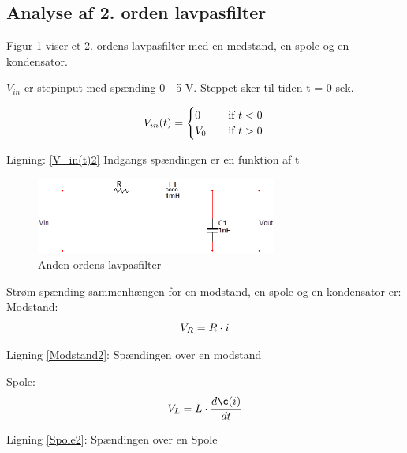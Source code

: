 \newpage

\subsection{Analyse af 2. orden lavpasfilter}

Figur \ref{2orden_ana} viser et 2. ordens lavpasfilter med en medstand, en spole og en kondensator.

$V_{in}$ er stepinput med spænding 0 - 5 V. Steppet sker til tiden t = 0 sek.

\begin{equation}
 V_{in}(t) =
  \begin{cases}
    0 & \quad \text{if } t <0\\
    V_{0}&\quad \text{if } t >0\\
  \end{cases}
  \label{V_in(t)2}\\
\end{equation}
\begin{center}

Ligning: \ref{V_in(t)2} Indgangs spændingen er en funktion af t
\end{center}

\begin{figure}[h]
 \begin{center}
  \includegraphics[height=2.5cm]{P_Fig/figur13_ana2}
  \caption{Anden ordens lavpasfilter}
  \label{2orden_ana}
 \end{center}
\end{figure}

\newpage

Strøm-spænding sammenhængen for en modstand, en spole og en kondensator er: \\

Modstand:
\begin{equation}
 V_{R} =R\cdot i
\label{Modstand2}\\
\end{equation}
\begin{center}
Ligning \ref{Modstand2}: Spændingen over en modstand
\end{center}

Spole:
\begin{equation}
	V_{L} = L\cdot \dfrac{d \c(i)}{dt}
\label{Spole2}\\
\end{equation}
\begin{center}
Ligning \ref{Spole2}: Spændingen over en Spole
\end{center}


